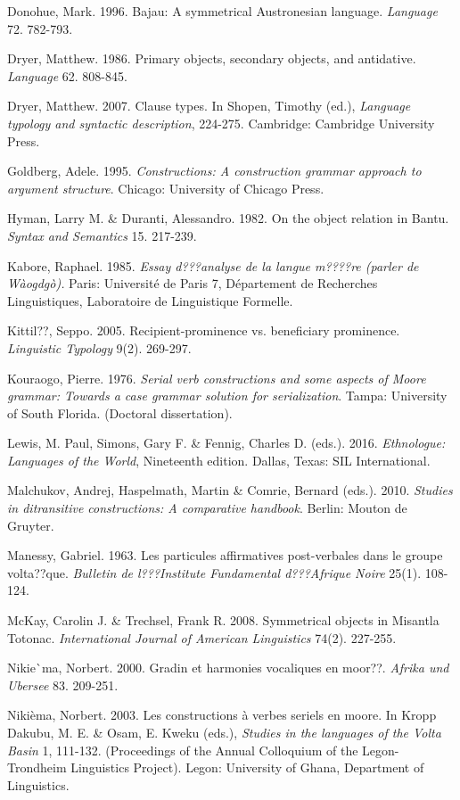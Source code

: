 \documentclass[output=paper]{langsci/langscibook}
\begin{document}
Donohue, Mark. 1996. Bajau: A symmetrical Austronesian language. \textit{Language} 72. 782-793.

Dryer, Matthew. 1986. Primary objects, secondary objects, and antidative. \textit{Language} 62. 808-845.

Dryer, Matthew. 2007. Clause types. In Shopen, Timothy (ed.), \textit{Language typology and syntactic description}, 224-275. Cambridge: Cambridge University Press. 

Goldberg, Adele. 1995. \textit{Constructions: A construction grammar approach to argument structure}. Chicago: University of Chicago Press. 

Hyman, Larry M. \& Duranti, Alessandro. 1982. On the object relation in Bantu. \textit{Syntax and Semantics} 15. 217-239. 

Kabore, Raphael. 1985. \textit{Essay d???analyse de la langue m????re (parler de Wàogdgò).} Paris: Université de Paris 7, Département de Recherches Linguistiques, Laboratoire de Linguistique Formelle. 

Kittil??, Seppo. 2005. Recipient-prominence vs. beneficiary prominence. \textit{Linguistic Typology} 9(2). 269-297. 

Kouraogo, Pierre. 1976. \textit{Serial verb constructions and some aspects of Moore grammar: Towards a case grammar solution for serialization}. Tampa: University of South Florida. (Doctoral dissertation). 

Lewis, M. Paul, Simons, Gary F. \& Fennig, Charles D. (eds.). 2016. \textit{Ethnologue: Languages of the World}, Nineteenth edition. Dallas, Texas: SIL International.

Malchukov, Andrej, Haspelmath, Martin \& Comrie, Bernard (eds.). 2010. \textit{Studies in ditransitive constructions: A comparative handbook}. Berlin: Mouton de Gruyter.

Manessy, Gabriel. 1963. Les particules affirmatives post-verbales dans le groupe volta??que. \textit{Bulletin de l???Institute Fundamental d???Afrique Noire} 25(1). 108-124.

McKay, Carolin J. \& Trechsel, Frank R. 2008. Symmetrical objects in Misantla Totonac. \textit{International Journal of American Linguistics} 74(2). 227-255.

Nikie\`{ }ma, Norbert. 2000. Gradin et harmonies vocaliques en moor??. \textit{Afrika und Ubersee} 83. 209-251. 

Nikièma, Norbert. 2003. Les constructions à verbes seriels en moore. In Kropp Dakubu, M. E. \& Osam, E. Kweku (eds.), \textit{Studies in the languages of the Volta Basin }1, 111-132. (Proceedings of the Annual Colloquium of the Legon-Trondheim Linguistics Project). Legon: University of Ghana, Department of Linguistics.
\end{document}
